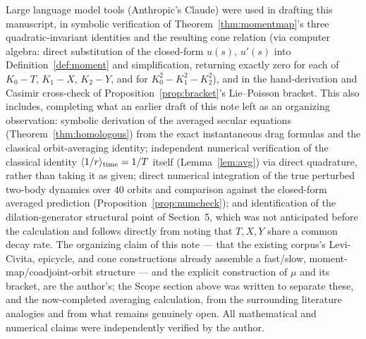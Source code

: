 \documentclass[11pt]{amsart}
\theoremstyle{remark}
\begin{document}
Large language model tools (Anthropic's Claude) were used in drafting this manuscript, in symbolic verification of Theorem~\ref{thm:momentmap}'s three quadratic-invariant identities and the resulting cone relation (via computer algebra: direct substitution of the closed-form $u(s)$, $u'(s)$ into Definition~\ref{def:moment} and simplification, returning exactly zero for each of $K_0-T$, $K_1-X$, $K_2-Y$, and for $K_0^2-K_1^2-K_2^2$), and in the hand-derivation and Casimir cross-check of Proposition~\ref{prop:bracket}'s Lie--Poisson bracket. This also includes, completing what an earlier draft of this note left as an organizing observation: symbolic derivation of the averaged secular equations (Theorem~\ref{thm:homologous}) from the exact instantaneous drag formulas and the classical orbit-averaging identity; independent numerical verification of the classical identity $\langle1/r\rangle_{\rm time}=1/T$ itself (Lemma~\ref{lem:avg}) via direct quadrature, rather than taking it as given; direct numerical integration of the true perturbed two-body dynamics over $40$ orbits and comparison against the closed-form averaged prediction (Proposition~\ref{prop:numcheck}); and identification of the dilation-generator structural point of Section~5, which was not anticipated before the calculation and follows directly from noting that $T,X,Y$ share a common decay rate. The organizing claim of this note --- that the existing corpus's Levi-Civita, epicycle, and cone constructions already assemble a fast/slow, moment-map/coadjoint-orbit structure --- and the explicit construction of $\mu$ and its bracket, are the author's; the Scope section above was written to separate these, and the now-completed averaging calculation, from the surrounding literature analogies and from what remains genuinely open. All mathematical and numerical claims were independently verified by the author.
\end{document}
